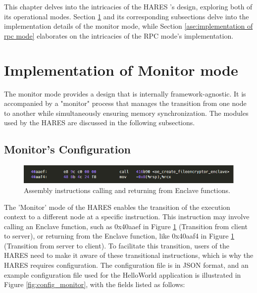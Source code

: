 \documentclass[article, doublespace,nopageskip]{VTthesis} %
\newcommand{\monitor}{HARES }
\begin{document}
    This chapter delves into the intricacies of the \monitor's design, exploring both of its operational modes. Section \ref{ase:implementation of monitor mode} and its corresponding subsections delve into the implementation details of the monitor mode, while Section \ref{ase:implementation of rpc mode} elaborates on the intricacies of the RPC mode's implementation. 
    
    \section{Implementation of Monitor mode} \label{ase:implementation of monitor mode}
    The monitor mode provides a design that is internally framework-agnostic. It is accompanied by a "monitor" process that manages the transition from one node to another while simultaneously ensuring memory synchronization. The modules used by the \monitor are discussed in the following subsections.
    
    \subsection{Monitor's Configuration} \label{ase: Json Parser}
    
    \begin{figure}[htb]
        \centering
        \includegraphics[scale=2.0]{figures/transisitonal_assembly_inst.png}
        \caption{Assembly instructions calling and returning from Enclave functions.} 
        \label{fig:transition_assembly}
    \end{figure}
 
    The 'Monitor' mode of the \monitor enables the transition of the execution context to a different node at a specific instruction. This instruction may involve calling an Enclave function, such as 0x40aaef in Figure \ref{fig:transition_assembly} (Transition from client to server), or returning from the Enclave function, like 0x40aaf4 in Figure \ref{fig:transition_assembly} (Transition from server to client). To facilitate this transition, users of the \monitor need to make it aware of these transitional instructions, which is why the \monitor requires configuration. The configuration file is in JSON format, and an example configuration file used for the HelloWorld application is illustrated in Figure \ref{fig:config_monitor}, with the fields listed as follows:
    
\end{document}
